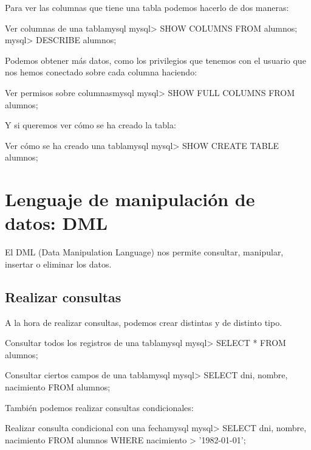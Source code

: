 Para ver las columnas que tiene una tabla podemos hacerlo de dos maneras:

\begin{mycode}{Ver columnas de una tabla}{mysql}{}
mysql> SHOW COLUMNS FROM alumnos;
mysql> DESCRIBE alumnos;
\end{mycode}

Podemos obtener más datos, como los privilegios que tenemos con el usuario que nos hemos conectado sobre cada columna haciendo:

\begin{mycode}{Ver permisos sobre columnas}{mysql}{}
mysql> SHOW FULL COLUMNS FROM alumnos;
\end{mycode}

Y si queremos ver cómo se ha creado la tabla:

\begin{mycode}{Ver cómo se ha creado una tabla}{mysql}{}
mysql> SHOW CREATE TABLE alumnos;
\end{mycode}


\section{Lenguaje de manipulación de datos: DML}
El DML (Data Manipulation Language) nos permite consultar, manipular, insertar o eliminar los datos.

\subsection{Realizar consultas}
A la hora de realizar consultas, podemos crear distintas y de distinto tipo.

\begin{mycode}{Consultar todos los registros de una tabla}{mysql}{}
mysql> SELECT * FROM alumnos;
\end{mycode}


\begin{mycode}{Consultar ciertos campos de una tabla}{mysql}{}
mysql> SELECT dni, nombre, nacimiento FROM alumnos;
\end{mycode}

También podemos realizar consultas condicionales:

\begin{mycode}{Realizar consulta condicional con una fecha}{mysql}{}
mysql> SELECT dni, nombre, nacimiento
            FROM alumnos
            WHERE nacimiento > '1982-01-01';
\end{mycode}


